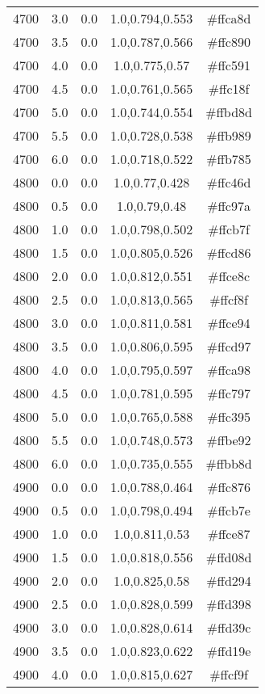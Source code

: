\begin{tabular}{ccccc}
4700 & 3.0 & 0.0 & 1.0,0.794,0.553 & \#ffca8d \\ 
4700 & 3.5 & 0.0 & 1.0,0.787,0.566 & \#ffc890 \\ 
4700 & 4.0 & 0.0 & 1.0,0.775,0.57 & \#ffc591 \\ 
4700 & 4.5 & 0.0 & 1.0,0.761,0.565 & \#ffc18f \\ 
4700 & 5.0 & 0.0 & 1.0,0.744,0.554 & \#ffbd8d \\ 
4700 & 5.5 & 0.0 & 1.0,0.728,0.538 & \#ffb989 \\ 
4700 & 6.0 & 0.0 & 1.0,0.718,0.522 & \#ffb785 \\ 
4800 & 0.0 & 0.0 & 1.0,0.77,0.428 & \#ffc46d \\ 
4800 & 0.5 & 0.0 & 1.0,0.79,0.48 & \#ffc97a \\ 
4800 & 1.0 & 0.0 & 1.0,0.798,0.502 & \#ffcb7f \\ 
4800 & 1.5 & 0.0 & 1.0,0.805,0.526 & \#ffcd86 \\ 
4800 & 2.0 & 0.0 & 1.0,0.812,0.551 & \#ffce8c \\ 
4800 & 2.5 & 0.0 & 1.0,0.813,0.565 & \#ffcf8f \\ 
4800 & 3.0 & 0.0 & 1.0,0.811,0.581 & \#ffce94 \\ 
4800 & 3.5 & 0.0 & 1.0,0.806,0.595 & \#ffcd97 \\ 
4800 & 4.0 & 0.0 & 1.0,0.795,0.597 & \#ffca98 \\ 
4800 & 4.5 & 0.0 & 1.0,0.781,0.595 & \#ffc797 \\ 
4800 & 5.0 & 0.0 & 1.0,0.765,0.588 & \#ffc395 \\ 
4800 & 5.5 & 0.0 & 1.0,0.748,0.573 & \#ffbe92 \\ 
4800 & 6.0 & 0.0 & 1.0,0.735,0.555 & \#ffbb8d \\ 
4900 & 0.0 & 0.0 & 1.0,0.788,0.464 & \#ffc876 \\ 
4900 & 0.5 & 0.0 & 1.0,0.798,0.494 & \#ffcb7e \\ 
4900 & 1.0 & 0.0 & 1.0,0.811,0.53 & \#ffce87 \\ 
4900 & 1.5 & 0.0 & 1.0,0.818,0.556 & \#ffd08d \\ 
4900 & 2.0 & 0.0 & 1.0,0.825,0.58 & \#ffd294 \\ 
4900 & 2.5 & 0.0 & 1.0,0.828,0.599 & \#ffd398 \\ 
4900 & 3.0 & 0.0 & 1.0,0.828,0.614 & \#ffd39c \\ 
4900 & 3.5 & 0.0 & 1.0,0.823,0.622 & \#ffd19e \\ 
4900 & 4.0 & 0.0 & 1.0,0.815,0.627 & \#ffcf9f \\ 

\end{tabular}
